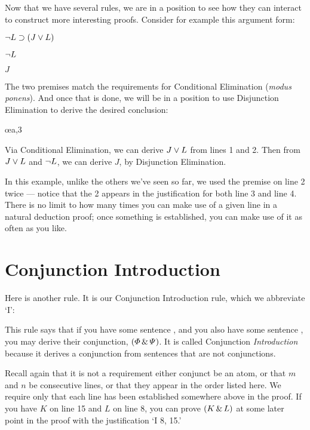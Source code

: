 Now that we have several rules, we are in a position to see how they can interact to construct more interesting proofs. Consider for example this argument form:

\begin{earg}
\item[] $\neg L \supset (J \vee L)$
\item[] $\neg L$
\item[\therefore] $J$
\end{earg}

The two premises match the requirements for Conditional Elimination (\emph{modus ponens}). And once that is done, we will be in a position to use Disjunction Elimination to derive the desired conclusion:

\begin{ndproof}
	  
	 
	 \oe{a,3}
\end{ndproof}

Via Conditional Elimination, we can derive $J \vee L$ from lines 1 and 2. Then from $J \vee L$ and $\neg L$, we can derive $J$, by Disjunction Elimination.

In this example, unlike the others we've seen so far, we used the premise on line 2 twice --- notice that the 2 appears in the justification for both line 3 and line 4. There is no limit to how many times you can make use of a given line in a natural deduction proof; once something is established, you can make use of it as often as you like.

\section{Conjunction Introduction}

Here is another rule. It is our Conjunction Introduction rule, which we abbreviate `{\eand}I':

\begin{ndproof}
	\metaA{}
	\metaB{}
	 
\end{ndproof}

This rule says that if you have some sentence \metaA{}, and you also have some sentence \metaB{}, you may derive their conjunction, $(\varPhi{} \,\&\, \varPsi{})$. It is called Conjunction \emph{Introduction} because it derives a conjunction from sentences that are not conjunctions.

Recall again that it is not a requirement either conjunct be an atom, or that $m$ and $n$ be consecutive lines, or that they appear in the order listed here. We require only that each line has been established somewhere above in the proof. If you have $K$ on line 15 and $L$ on line 8, you can prove $(K\,\&\, L)$ at some later point in the proof with the justification `{\eand}I 8, 15.'

